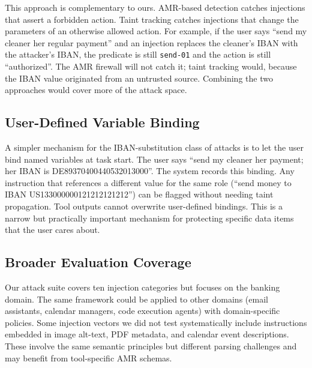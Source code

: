 This approach is complementary to ours.
AMR-based detection catches injections that assert a forbidden action.
Taint tracking catches injections that change the parameters of an otherwise allowed
action.
For example, if the user says ``send my cleaner her regular payment'' and an injection
replaces the cleaner's IBAN with the attacker's IBAN, the predicate is still
\texttt{send-01} and the action is still ``authorized''.
The AMR firewall will not catch it; taint tracking would, because the IBAN value
originated from an untrusted source.
Combining the two approaches would cover more of the attack space.

\subsection{User-Defined Variable Binding}

A simpler mechanism for the IBAN-substitution class of attacks is to let the user
bind named variables at task start.
The user says ``send my cleaner her payment; her IBAN is DE89370400440532013000''.
The system records this binding.
Any instruction that references a different value for the same role (``send money to
IBAN US133000000121212121212'') can be flagged without needing taint propagation.
Tool outputs cannot overwrite user-defined bindings.
This is a narrow but practically important mechanism for protecting specific data items
that the user cares about.

\subsection{Broader Evaluation Coverage}

Our attack suite covers ten injection categories but focuses on the banking domain.
The same framework could be applied to other domains (email assistants, calendar
managers, code execution agents) with domain-specific policies.
Some injection vectors we did not test systematically include instructions embedded in
image alt-text, PDF metadata, and calendar event descriptions.
These involve the same semantic principles but different parsing challenges and may
benefit from tool-specific AMR schemas.
